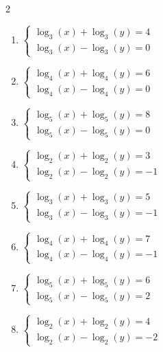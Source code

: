\documentclass[12pt,a4paper]{article}
\begin{document}
\begin{multicols}{2}
\begin{enumerate}[leftmargin=*, itemsep=6pt]
\item \(\begin{cases} \log_{3}\left(x\right)+\log_{3}\left(y\right)=4\\ \log_{3}\left(x\right)-\log_{3}\left(y\right)=0\end{cases}\)

\item \(\begin{cases} \log_{4}\left(x\right)+\log_{4}\left(y\right)=6\\ \log_{4}\left(x\right)-\log_{4}\left(y\right)=0\end{cases}\)

\item \(\begin{cases} \log_{5}\left(x\right)+\log_{5}\left(y\right)=8\\ \log_{5}\left(x\right)-\log_{5}\left(y\right)=0\end{cases}\)

\item \(\begin{cases} \log_{2}\left(x\right)+\log_{2}\left(y\right)=3\\ \log_{2}\left(x\right)-\log_{2}\left(y\right)=-1\end{cases}\)

\item \(\begin{cases} \log_{3}\left(x\right)+\log_{3}\left(y\right)=5\\ \log_{3}\left(x\right)-\log_{3}\left(y\right)=-1\end{cases}\)

\item \(\begin{cases} \log_{4}\left(x\right)+\log_{4}\left(y\right)=7\\ \log_{4}\left(x\right)-\log_{4}\left(y\right)=-1\end{cases}\)

\item \(\begin{cases} \log_{5}\left(x\right)+\log_{5}\left(y\right)=6\\ \log_{5}\left(x\right)-\log_{5}\left(y\right)=2\end{cases}\)

\item \(\begin{cases} \log_{2}\left(x\right)+\log_{2}\left(y\right)=4\\ \log_{2}\left(x\right)-\log_{2}\left(y\right)=-2\end{cases}\)


\end{enumerate}
\end{multicols}
\end{document}
